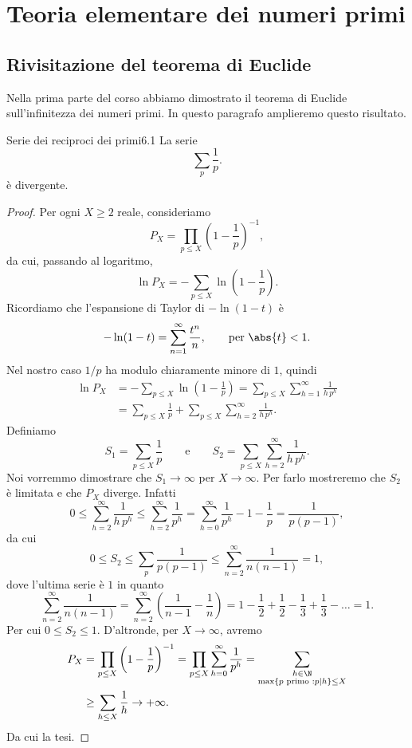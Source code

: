 \chapter{Teoria elementare dei numeri primi}
%
%
\section{Rivisitazione del teorema di Euclide}

Nella prima parte del corso abbiamo dimostrato il teorema di Euclide sull'infinitezza dei numeri primi.
In questo paragrafo amplieremo questo risultato.

\begin{teor}{Serie dei reciproci dei primi}{6.1}
	La serie
	\[
		\sum_p \frac{1}{p}.
	\]
	è divergente.
\end{teor}

\begin{proof}
	Per ogni \(X\ge 2\) reale, consideriamo
	\[
		P_X = \prod_{p \le X} \left( 1- \frac{1}{p} \right)^{-1},
	\]
	da cui, passando al logaritmo,
	\[
		\ln P_X = -\sum_{p \le X} \ln \left( 1 - \frac{1}{p} \right).
	\]
	Ricordiamo che l'espansione di Taylor di \(-\ln(1-t)\) è
	\[
		-\ln(1-t) = \sum_{n=1}^{\infty} \frac{t^n}{n}, \qquad\text{per }\abs{t}<1.
	\]
	Nel nostro caso \(1/p\) ha modulo chiaramente minore di \(1\), quindi
	\[
		\begin{split}
			\ln P_X & = -\sum_{p \le X} \ln \left( 1 - \frac{1}{p} \right) = \sum_{p\le X} \sum_{h=1}^{\infty} \frac{1}{h\,p^h}\\
			& = \sum_{p\le X} \frac{1}{p} + \sum_{p\le X} \sum_{h=2}^{\infty} \frac{1}{h\,p^h}.
		\end{split}
	\]
	Definiamo
	\[
		S_1 = \sum_{p\le X} \frac{1}{p} \qquad\text{e}\qquad S_2 = \sum_{p\le X} \sum_{h=2}^{\infty} \frac{1}{h\,p^h}.
	\]
	Noi vorremmo dimostrare che \(S_1 \to \infty\) per \(X \to \infty\).
	Per farlo mostreremo che \(S_2\) è limitata e che \(P_X\) diverge.
	Infatti
	\[
		0 \le \sum_{h=2}^{\infty} \frac{1}{h\,p^h} \le \sum_{h=2}^{\infty} \frac{1}{p^h} = \sum_{h=0}^{\infty}\frac{1}{p^h}-1- \frac{1}{p} = \frac{1}{p(p-1)},
	\]
	da cui
	\[
		0 \le S_2 \le \sum_p \frac{1}{p(p-1)} \le \sum_{n=2}^{\infty} \frac{1}{n(n-1)} = 1,
	\]
	dove l'ultima serie è \(1\) in quanto
	\[
		\sum_{n=2}^{\infty} \frac{1}{n(n-1)} = \sum_{n=2}^{\infty} \left( \frac{1}{n-1} - \frac{1}{n} \right) = 1- \frac{1}{2} + \frac{1}{2} - \frac{1}{3} + \frac{1}{3} - \ldots = 1.
	\]
	Per cui \(0\le S_2 \le 1\).
	D'altronde, per \(X\to \infty\), avremo
	\[
		\begin{split}
			P_X & = \prod_{p\le X} \left( 1 - \frac{1}{p} \right)^{-1} = \prod_{p\le X} \sum_{h=0}^{\infty} \frac{1}{p^h} = \sum_{\substack{h\in\N\\\max\{p\text{ primo } : p \mid h\}\le X}}\\
			& \ge \sum_{h\le X} \frac{1}{h} \to +\infty.
		\end{split}
	\]
	Da cui la tesi.
\end{proof}

